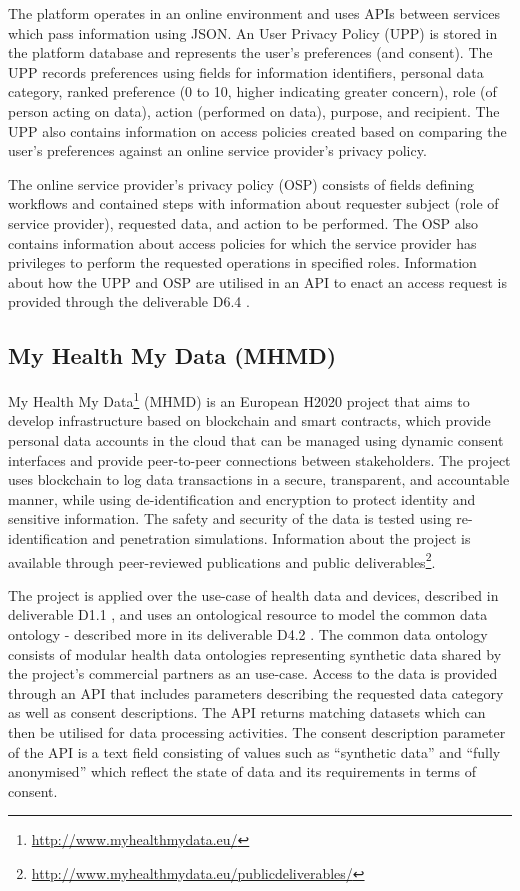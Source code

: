 The platform operates in an online environment and uses APIs between services which pass information using JSON. An User Privacy Policy (UPP) \cite{noauthor_d6.7_2017} is stored in the platform database and represents the user's preferences (and consent). The UPP records preferences using fields for information identifiers, personal data category, ranked preference (0 to 10, higher indicating greater concern), role (of person acting on data), action (performed on data), purpose, and recipient. The UPP also contains information on access policies created based on comparing the user's preferences against an online service provider's privacy policy. 

The online service provider's privacy policy (OSP) \cite{noauthor_d6.7_2017} consists of fields defining workflows and contained steps with information about requester subject (role of service provider), requested data, and action to be performed. The OSP also contains information about access policies for which the service provider has privileges to perform the requested operations in specified roles. Information about how the UPP and OSP are utilised in an API to enact an access request is provided through the deliverable D6.4 \cite{noauthor_d6.4_2017}.

\subsection*{My Health My Data (MHMD)}
My Health My Data\footnote{\url{http://www.myhealthmydata.eu/}} (MHMD) is an European H2020 project that aims to develop infrastructure based on blockchain and smart contracts, which provide personal data accounts in the cloud that can be managed using dynamic consent interfaces and provide peer-to-peer connections between stakeholders. The project uses blockchain to log data transactions in a secure, transparent, and accountable manner, while using de-identification and encryption to protect identity and sensitive information. The safety and security of the data is tested using re-identification and penetration simulations.
Information about the project is available through peer-reviewed publications and public deliverables\footnote{\url{http://www.myhealthmydata.eu/publicdeliverables/}}.

The project is applied over the use-case of health data and devices, described in deliverable D1.1 \cite{noauthor_d1.1_2017}, and uses an ontological resource to model the common data ontology - described more in its deliverable D4.2 \cite{teodoro_d4.2_2018}. The common data ontology consists of modular health data ontologies representing synthetic data shared by the project's commercial partners as an use-case.
Access to the data is provided through an API that includes parameters describing the requested data category as well as consent descriptions. The API returns matching datasets which can then be utilised for data processing activities. The consent description parameter of the API is a text field consisting of values such as ``synthetic data'' and ``fully anonymised'' which reflect the state of data and its requirements in terms of consent. 

